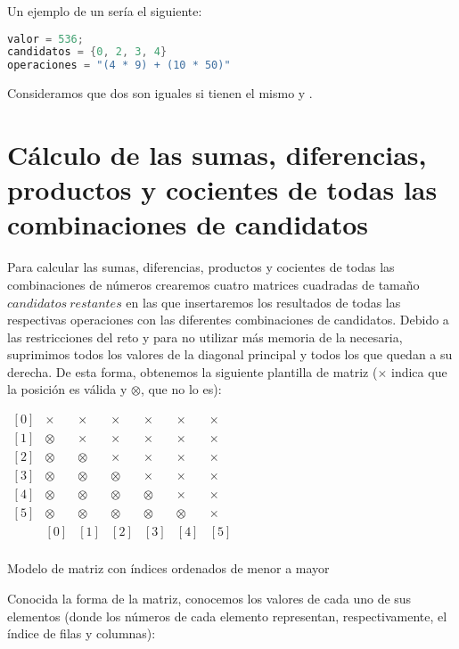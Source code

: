 Un ejemplo de un  sería el siguiente:

\begin{lstlisting}[language=C++]
valor = 536;
candidatos = {0, 2, 3, 4}
operaciones = "(4 * 9) + (10 * 50)"
\end{lstlisting}

Consideramos que dos  son iguales si tienen el mismo  y .

\section{Cálculo de las sumas, diferencias, productos y cocientes de todas las combinaciones de candidatos}

Para calcular las sumas, diferencias, productos y cocientes de todas las combinaciones de números crearemos cuatro matrices cuadradas de tamaño $candidatos\ restantes$ en las que insertaremos los resultados de todas las respectivas operaciones con las diferentes combinaciones de candidatos.
Debido a las restricciones del reto y para no utilizar más memoria de la necesaria, suprimimos todos los valores de la diagonal principal y todos los que quedan a su derecha.
De esta forma, obtenemos la siguiente plantilla de matriz ($\times$ indica que la posición es válida y $\otimes$, que no lo es):


\begin{center}
$\begin{matrix}
[0] & \times  & \times  & \times  & \times  & \times  & \times \\
[1] & \otimes & \times  & \times  & \times  & \times  & \times \\
[2] & \otimes & \otimes & \times  & \times  & \times  & \times \\
[3] & \otimes & \otimes & \otimes & \times  & \times  & \times \\
[4] & \otimes & \otimes & \otimes & \otimes & \times  & \times \\
[5] & \otimes & \otimes & \otimes & \otimes & \otimes & \times \\
    &   [0]   &   [1]   &   [2]   &   [3]   &   [4]   &   [5]  \\
\end{matrix}$

Modelo de matriz con índices ordenados de menor a mayor
\end{center}

Conocida la forma de la matriz, conocemos los valores de cada uno de sus elementos (donde los números de cada elemento representan, respectivamente, el índice de filas y columnas):

